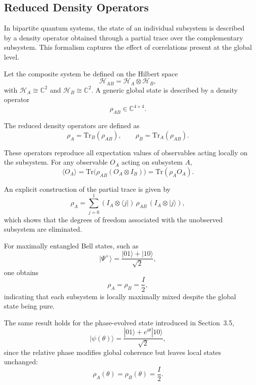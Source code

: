 \documentclass[a4paper]{article}
\begin{document}

\subsection{Reduced Density Operators}

In bipartite quantum systems, the state of an individual subsystem is described by a density operator obtained through a partial trace over the complementary subsystem. This formalism captures the effect of correlations present at the global level.

\medskip

Let the composite system be defined on the Hilbert space
\[
\mathcal{H}_{AB} = \mathcal{H}_A \otimes \mathcal{H}_B,
\]
with \( \mathcal{H}_A \cong \mathbb{C}^2 \) and \( \mathcal{H}_B \cong \mathbb{C}^2 \). A generic global state is described by a density operator
\[
\rho_{AB} \in \mathbb{C}^{4 \times 4}.
\]

The reduced density operators are defined as
\[
\rho_A = \mathrm{Tr}_B(\rho_{AB}), \qquad
\rho_B = \mathrm{Tr}_A(\rho_{AB}).
\]

\medskip

These operators reproduce all expectation values of observables acting locally on the subsystem. For any observable \( O_A \) acting on subsystem \( A \),
\[
\langle O_A \rangle
=
\mathrm{Tr}\!\big(\rho_{AB}(O_A \otimes I_B)\big)
=
\mathrm{Tr}(\rho_A O_A).
\]

\medskip

An explicit construction of the partial trace is given by
\[
\rho_A
=
\sum_{j=0}^{1}
(I_A \otimes \langle j|)\,\rho_{AB}\,(I_A \otimes |j\rangle),
\]
which shows that the degrees of freedom associated with the unobserved subsystem are eliminated.

\medskip

For maximally entangled Bell states, such as
\[
|\Psi^+\rangle = \frac{|01\rangle + |10\rangle}{\sqrt{2}},
\]
one obtains
\[
\rho_A = \rho_B = \frac{I}{2},
\]
indicating that each subsystem is locally maximally mixed despite the global state being pure.

\medskip

The same result holds for the phase-evolved state introduced in Section~3.5,
\[
|\psi(\theta)\rangle = \frac{|01\rangle + e^{i\theta}|10\rangle}{\sqrt{2}},
\]
since the relative phase modifies global coherence but leaves local states unchanged:
\[
\rho_A(\theta) = \rho_B(\theta) = \frac{I}{2}.
\]
\end{document}
